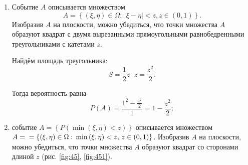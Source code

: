 \begin{enumerate}[label=\alph*)]
\item Событие $A$ описывается множеством
$$A =
\left\{ \left( \xi, \eta \right) \in \Omega: \,
\left| \xi - \eta \right| < z,
z \in \left( 0, 1 \right) \right\}.$$
Изобразив $A$ на плоскости,
можно убедиться,
что точки множества $A$ образуют квадрат с двумя вырезанными прямоугольными равнобедренными треугольниками с катетами $z$.

Найдём площадь треугольника:
$$S = \frac{1}{2} z \cdot z =
\frac{z^2}{2}.$$

Тогда вероятность равна
$$P \left( A \right) =
\frac{1^2 - \frac{z^2}{2}}{1} =
1 - \frac{z^2}{2};$$

\item событие
$A =
\left\{ P \left( \min \left( \xi, \eta \right) < z \right) \right\}$
описывается множеством
$A = \\
= \left\{ \left( \xi, \eta \right) \in \Omega: \,
\min \left( \xi, \eta \right) < z, \,
z \in \left( 0, 1 \right) \right\} $.
Изобразив $A$ на плоскости, можно убедиться, что точки множества $A$ образуют квадрат со сторонами длиной $z$ (рис. \ref{fig:45}, \ref{fig:451}).


\end{enumerate}
